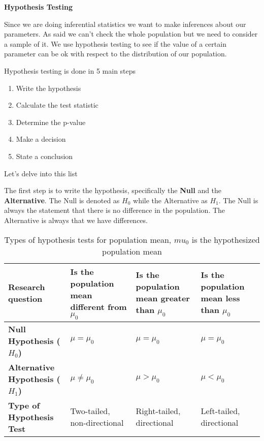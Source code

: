 \vspace{10pt}

\textbf{Hypothesis Testing}

\vspace{10pt}

Since we are doing inferential statistics we want to make inferences about our parameters.
As said we can't check the whole population but we need to consider a sample of it.
We use hypothesis testing to see if the value of a certain parameter can be ok with respect to the distribution of our population.

\vspace{10pt}

Hypothesis testing is done in 5 main steps

\begin{enumerate}
    \item Write the hypothesis
    \item Calculate the test statistic
    \item Determine the p-value
    \item Make a decision
    \item State a conclusion
\end{enumerate}

\vspace{10pt}

Let's delve into this list

\vspace{10pt}

The first step is to write the hypothesis, specifically the \textbf{Null} and the \textbf{Alternative}. The Null is denoted as $H_0$ while the Alternative as $H_1$.
The Null is always the statement that there is no difference in the population. The Alternative is always that we have differences.

\begin{table}[H]
\centering
\begin{tabular}{|p{3cm}|p{3.5cm}|p{3.5cm}|p{3.5cm}|}
\hline
\textbf{Research question} & Is the population mean \newline different from $\mu_0$ & Is the population mean \newline greater than $\mu_0$ & Is the population mean \newline less than $\mu_0$ \\
\hline
\textbf{Null Hypothesis ($H_0$)} & $\mu = \mu_0$ & $\mu = \mu_0$ & $\mu = \mu_0$ \\
\hline
\textbf{Alternative Hypothesis ($H_1$)} & $\mu \neq \mu_0$ & $\mu > \mu_0$ & $\mu < \mu_0$ \\
\hline
\textbf{Type of Hypothesis Test} & Two-tailed, \newline non-directional & Right-tailed, \newline directional & Left-tailed, \newline directional \\
\hline
\end{tabular}
\caption{Types of hypothesis tests for population mean, $mu_0$ is the hypothesized population mean}
\end{table}

